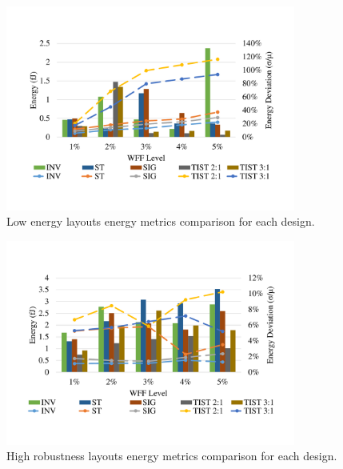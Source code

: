 \documentclass[diss,pgmicro,english]{iiufrgs}
\begin{document}
    \begin{figure}[t]
        \centering
            \includegraphics[width=0.85\textwidth, trim={1.25cm 3cm 2cm 3cm}, clip]{compLowEnergy.pdf}
            \caption{Low energy layouts energy metrics comparison for each design.}
        \label{figCompLowEnergy}
    \end{figure}

    \begin{figure}[h]
        \centering
            \includegraphics[width=0.85\textwidth, trim={1.25cm 3cm 2cm 3cm}, clip]{compHighRobustness.pdf}
            \caption{High robustness layouts energy metrics comparison for each design.}
        \label{figCompHighRobustness}
    \end{figure}
\end{document}
